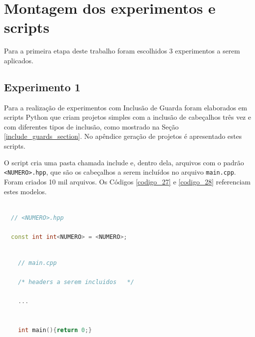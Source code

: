 \section{Montagem dos experimentos e scripts}

Para a primeira etapa deste trabalho foram escolhidos 3 experimentos a
 serem aplicados.

\subsection{Experimento 1}\label{experimento_1}

Para a realização de experimentos com Inclusão de Guarda foram elaborados
 em scripts Python que criam projetos simples com a inclusão de cabeçalhos
 três vez e com diferentes tipos de inclusão, como mostrado na  Seção
 \ref{include_guards_section}.
 No apêndice geração de projetos é apresentado estes scripts.

O script cria uma pasta chamada include e, dentro dela, arquivos com o padrão
 \texttt{<NUMERO>.hpp}, que são os cabeçalhos a serem incluídos no arquivo 
\texttt{main.cpp}.
 Foram criados 10 mil arquivos. Os Códigos \ref{codigo_27} e  \ref{codigo_28}
 referenciam estes modelos.



\begin{lstlisting}[language=C++,frame=single,captionpos=b,caption={Modelo de
									 Arquivo .hpp gerado pelos scripts de 
									  guardas de inclusão},
                                                   label=codigo_27]

  // <NUMERO>.hpp

  const int int<NUMERO> = <NUMERO>;

\end{lstlisting}



\begin{lstlisting}[language=C++,frame=single,captionpos=b,caption={Modelo de
                               Arquivo main.cpp criado pelos scripts de
                                                     guardas de inclusão},
                                                          label=codigo_28]

    // main.cpp

    /* headers a serem incluidos   */

    ...


    int main(){return 0;}

\end{lstlisting}




